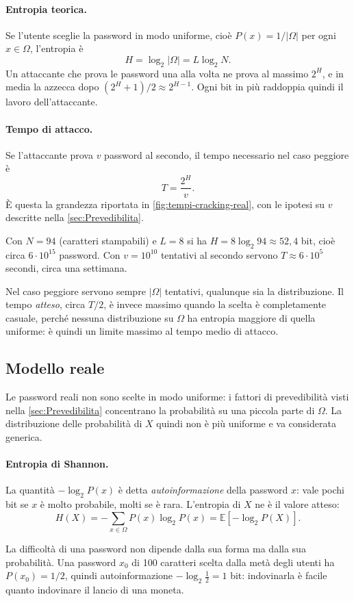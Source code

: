 \paragraph{Entropia teorica.}
Se l'utente sceglie la password in modo uniforme, cioè \(P(x) = 1/\vert\Omega\vert\) per ogni \(x \in \Omega\), l'entropia è
\[
    \boxed{
        H = \log_2 \vert\Omega\vert = L \log_2 N.
    }
\]
Un attaccante che prova le password una alla volta ne prova al massimo \(2^H\), e in media la azzecca dopo \((2^H + 1)/2 \approx 2^{H-1}\). Ogni bit in più raddoppia quindi il lavoro dell'attaccante.

\paragraph{Tempo di attacco.}
Se l'attaccante prova \(v\) password al secondo, il tempo necessario nel caso peggiore è
\[
    T = \frac{2^H}{v}.
\]
È questa la grandezza riportata in \cref{fig:tempi-cracking-real}, con le ipotesi su \(v\) descritte nella \cref{sec:Prevedibilita}.
\begin{example}
    Con \(N = 94\) (caratteri stampabili) e \(L = 8\) si ha \(H = 8 \log_2 94 \approx 52{,}4\) bit, cioè circa \(6 \cdot 10^{15}\) password. Con \(v = 10^{10}\) tentativi al secondo servono \(T \approx 6 \cdot 10^{5}\) secondi, circa una settimana.
\end{example}
Nel caso peggiore servono sempre \(\vert\Omega\vert\) tentativi, qualunque sia la distribuzione. Il tempo \emph{atteso}, circa \(T/2\), è invece massimo quando la scelta è completamente casuale, perché nessuna distribuzione su \(\Omega\) ha entropia maggiore di quella uniforme: è quindi un limite massimo al tempo medio di attacco.

\subsection{Modello reale}\label{app:ModelloReale}
Le password reali non sono scelte in modo uniforme: i fattori di prevedibilità visti nella \cref{sec:Prevedibilita} concentrano la probabilità su una piccola parte di \(\Omega\). La distribuzione delle probabilità di \(X\) quindi non è più uniforme e va considerata generica.

\paragraph{Entropia di Shannon.}
La quantità \(-\log_2 P(x)\) è detta \emph{autoinformazione} della password \(x\): vale pochi bit se \(x\) è molto probabile, molti se è rara. L'entropia di \(X\) ne è il valore atteso:
\[
    \boxed{
        H(X) = -\sum_{x \in \Omega} P(x) \log_2 P(x) = \mathbb{E}\left[-\log_2 P(X)\right].
    }
\]
\begin{example}
    La difficoltà di una password non dipende dalla sua forma ma dalla sua probabilità. Una password \(x_0\) di 100 caratteri scelta dalla metà degli utenti ha \(P(x_0) = 1/2\), quindi autoinformazione \(-\log_2 \tfrac{1}{2} = 1\) bit: indovinarla è facile quanto indovinare il lancio di una moneta.
\end{example}

